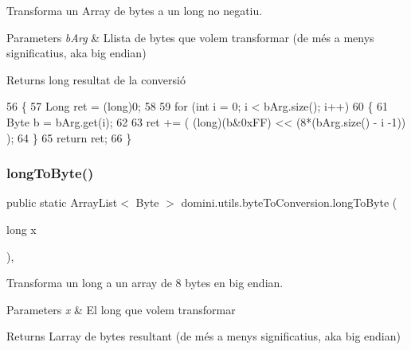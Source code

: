 Transforma un Array de bytes a un long no negatiu. 


\begin{DoxyParams}{Parameters}
{\em b\+Arg} & Llista de bytes que volem transformar (de més a menys significatius, aka big endian) \\
\hline
\end{DoxyParams}
\begin{DoxyReturn}{Returns}
long resultat de la conversió 
\end{DoxyReturn}

\begin{DoxyCode}
56     \{
57         Long ret = (long)0;
58 
59         \textcolor{keywordflow}{for} (\textcolor{keywordtype}{int} i = 0; i < bArg.size(); i++)
60         \{
61             Byte b = bArg.get(i);
62             
63             ret += ( (long)(b&0xFF) << (8*(bArg.size() - i -1)) );
64         \}
65         \textcolor{keywordflow}{return} ret;
66     \}
\end{DoxyCode}
\mbox{\label{classdomini_1_1utils_1_1byteToConversion_ab4466a4c6dd5f6a350953031e99a959d}} 
\subsubsection{\texorpdfstring{long\+To\+Byte()}{longToByte()}}
{\footnotesize\ttfamily public static Array\+List$<$ Byte $>$ domini.\+utils.\+byte\+To\+Conversion.\+long\+To\+Byte (\begin{DoxyParamCaption}\item[{long}]{x }\end{DoxyParamCaption})\hspace{0.3cm}{\ttfamily [inline]}, {\ttfamily [static]}}



Transforma un long a un array de 8 bytes en big endian. 


\begin{DoxyParams}{Parameters}
{\em x} & El long que volem transformar \\
\hline
\end{DoxyParams}
\begin{DoxyReturn}{Returns}
L\textquotesingle{}array de bytes resultant (de més a menys significatius, aka big endian) 
\end{DoxyReturn}

